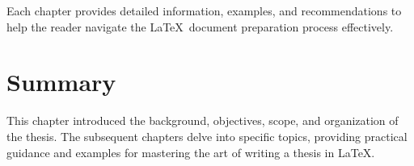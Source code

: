 		Each chapter provides detailed information, examples, and recommendations to help the reader navigate the \LaTeX\ document preparation process effectively.

	\section{Summary}
		This chapter introduced the background, objectives, scope, and organization of the thesis. 
		The subsequent chapters delve into specific topics, providing practical guidance and examples for mastering the art of writing a thesis in \LaTeX.